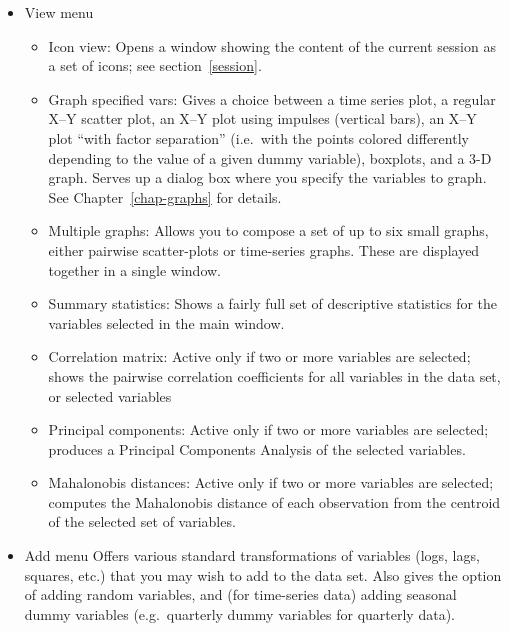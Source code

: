 \begin{itemize}
\item \textsf{View menu} 
  \begin{itemize}
  \item \textsf{Icon view}: Opens a window showing the content of
    the current session as a set of icons; see section~\ref{session}.
  \item \textsf{Graph specified vars}: Gives a choice between a time
    series plot, a regular X--Y scatter plot, an X--Y plot using
    impulses (vertical bars), an X--Y plot ``with factor separation''
    (i.e.\ with the points colored differently depending to the value
    of a given dummy variable), boxplots, and a 3-D graph. Serves up a
    dialog box where you specify the variables to graph. See
    Chapter~\ref{chap-graphs} for details.
  \item \textsf{Multiple graphs}: Allows you to compose a set of up to
    six small graphs, either pairwise scatter-plots or time-series
    graphs.  These are displayed together in a single window.
  \item \textsf{Summary statistics}: Shows a fairly full set of
    descriptive statistics for the variables selected in the main
    window.
  \item \textsf{Correlation matrix}: Active only if two or more
    variables are selected; shows the pairwise correlation
    coefficients for all variables in the data set, or selected
    variables
  \item \textsf{Principal components}: Active only if two or more
    variables are selected; produces a Principal Components Analysis
    of the selected variables.
  \item \textsf{Mahalonobis distances}: Active only if two or more
    variables are selected; computes the Mahalonobis distance of each
    observation from the centroid of the selected set of variables.
  \end{itemize}

\item \textsf{Add menu} Offers various standard transformations
  of variables (logs, lags, squares, etc.) that you may wish to add to
  the data set. Also gives the option of adding random variables, and
  (for time-series data) adding seasonal dummy variables (e.g.\
  quarterly dummy variables for quarterly data).


\end{itemize}
